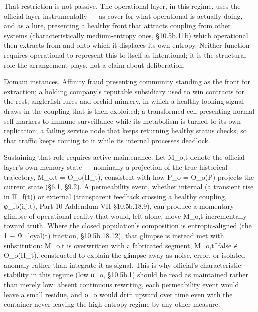 \documentclass[
]{article}
\begin{document}
That restriction is not passive. The operational layer, in this regime,
uses the official layer instrumentally --- as cover for what operational
is actually doing, and as a lure, presenting a healthy front that
attracts coupling from other systems (characteristically medium-entropy
ones, §10.5b.11b) which operational then extracts from and onto which it
displaces its own entropy. Neither function requires operational to
represent this to itself as intentional; it is the structural role the
arrangement plays, not a claim about deliberation.

Domain instances. Affinity fraud presenting community standing as the
front for extraction; a holding company's reputable subsidiary used to
win contracts for the rest; anglerfish lures and orchid mimicry, in
which a healthy-looking signal draws in the coupling that is then
exploited; a transformed cell presenting normal self-markers to immune
surveillance while its metabolism is turned to its own replication; a
failing service node that keeps returning healthy status checks, so that
traffic keeps routing to it while its internal processes deadlock.

Sustaining that role requires active maintenance. Let M\_o,t denote the
official layer's own memory state --- nominally a projection of the true
historical trajectory, M\_o,t = O\_o(H\_t), consistent with how P\_o =
O\_o(P) projects the current state (§6.1, §9.2). A permeability event,
whether internal (a transient rise in Π\_f(t)) or external (transparent
feedback crossing a healthy coupling, φ\_fb(i,j,t), Part 10 Addendum VII
§10.5b.18.9), can produce a momentary glimpse of operational reality
that would, left alone, move M\_o,t incrementally toward truth. Where
the closed population's composition is entropic-aligned (the 1 −
Ψ\_loyal(t) fraction, §10.5b.18.12), that glimpse is instead met with
substitution: M\_o,t is overwritten with a fabricated segment,
M\_o,t\^{}false ≠ O\_o(H\_t), constructed to explain the glimpse away as
noise, error, or isolated anomaly rather than integrate it as signal.
This is why official's characteristic stability in this regime (low
σ\_o, §10.5b.1) should be read as maintained rather than merely low:
absent continuous rewriting, each permeability event would leave a small
residue, and σ\_o would drift upward over time even with the container
never leaving the high-entropy regime by any other measure.
\end{document}

